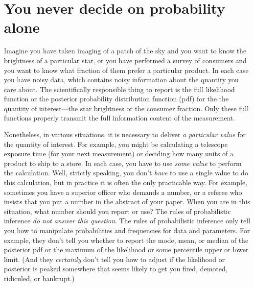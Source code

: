 \documentclass[12pt,twoside,pdftex]{article}
\begin{document}
\section{You never decide on probability alone}

Imagine you have taken imaging of a patch of the sky and you want to
know the brightness of a particular star, or you have performed a
survey of consumers and you want to know what fraction of them prefer
a particular product.  In each case you have noisy data, which
contains noisy information about the quantity you care about.  The
scientifically responsible thing to report is the full likelihood
function or the posterior probability distribution
function (pdf) for the the
quantity of interest---the star brightness or the consumer fraction.
Only these full functions properly transmit the full information
content of the measurement.

Nonetheless, in various situations, it is necessary to deliver \emph{a
  particular value} for the quantity of interest.  For example, you
might be calculating a telescope exposure time (for your next
measurement) or deciding how many units of a product to ship to a
store.  In each case, you have to use \emph{some value} to perform the
calculation.  Well, strictly speaking, you don't \emph{have} to use a
single value to do this calculation, but in practice it is often the
only practicable way.  For example, sometimes you have a superior
officer who demands a number, or a referee who insists that you put a
number in the abstract of your paper.  When you are in this situation,
what number should you report or use?  The rules of probabilistic
inference \emph{do not answer this question}.  The rules of
probabilistic inference only tell you how to manipulate probabilities
and frequencies for data and parameters.  For example, they don't tell
you whether to report the mode, mean, or median of the posterior pdf
or the maximum of the likelihood or some percentile upper or lower
limit.  (And they \emph{certainly} don't tell you how to adjust if the
likelihood or posterior is peaked somewhere that seems likely to get
you fired, demoted, ridiculed, or bankrupt.)
\end{document}
